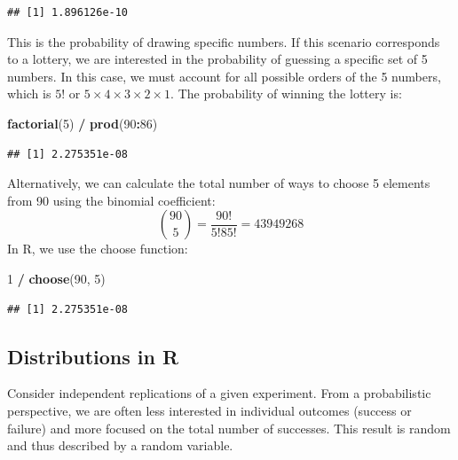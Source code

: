 \documentclass[
]{article}
\newenvironment{Shaded}{\begin{snugshade}}{\end{snugshade}}
\newcommand{\DecValTok}[1]{\textcolor[rgb]{0.00,0.00,0.81}{#1}}
\newcommand{\FunctionTok}[1]{\textcolor[rgb]{0.13,0.29,0.53}{\textbf{#1}}}
\newcommand{\NormalTok}[1]{#1}
\newcommand{\SpecialCharTok}[1]{\textcolor[rgb]{0.81,0.36,0.00}{\textbf{#1}}}
\begin{document}
\begin{verbatim}
## [1] 1.896126e-10
\end{verbatim}

This is the probability of drawing specific numbers. If this scenario
corresponds to a lottery, we are interested in the probability of
guessing a specific set of 5 numbers. In this case, we must account for
all possible orders of the 5 numbers, which is \(5!\) or
\(5 \times 4 \times 3 \times 2 \times 1\). The probability of winning
the lottery is:

\begin{Shaded}
\begin{Highlighting}[]
\FunctionTok{factorial}\NormalTok{(}\DecValTok{5}\NormalTok{) }\SpecialCharTok{/} \FunctionTok{prod}\NormalTok{(}\DecValTok{90}\SpecialCharTok{:}\DecValTok{86}\NormalTok{)}
\end{Highlighting}
\end{Shaded}

\begin{verbatim}
## [1] 2.275351e-08
\end{verbatim}

Alternatively, we can calculate the total number of ways to choose 5
elements from 90 using the binomial coefficient:
\[\binom{90}{5} = \frac{90!}{5! 85!} = 43949268\] In R, we use the
choose function:

\begin{Shaded}
\begin{Highlighting}[]
\DecValTok{1} \SpecialCharTok{/} \FunctionTok{choose}\NormalTok{(}\DecValTok{90}\NormalTok{, }\DecValTok{5}\NormalTok{)}
\end{Highlighting}
\end{Shaded}

\begin{verbatim}
## [1] 2.275351e-08
\end{verbatim}

\hypertarget{distributions-in-r}{%
\subsection{Distributions in R}\label{distributions-in-r}}

Consider independent replications of a given experiment. From a
probabilistic perspective, we are often less interested in individual
outcomes (success or failure) and more focused on the total number of
successes. This result is random and thus described by a random
variable.
\end{document}
